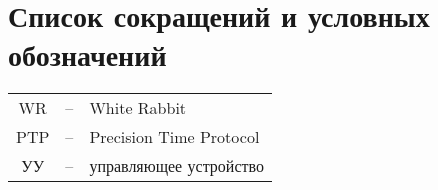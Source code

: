 \chapter*{Список сокращений и условных обозначений}             %
\noindent
\addtocounter{table}{-1}%


\begin{tabular}{ccl}
WR & -- & White Rabbit\\
PTP & -- & Precision Time Protocol\\
УУ & -- & управляющее устройство\\
\end{tabular}